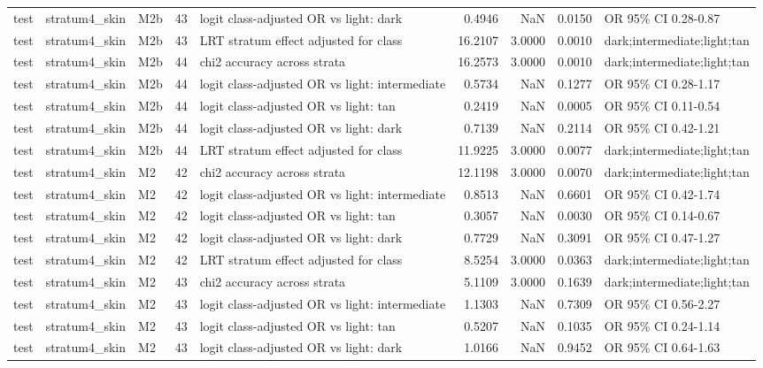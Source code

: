 \begin{tabular}{lllrlrrrl}
test & stratum4\_skin & M2b & 43 & logit class-adjusted OR vs light: dark & 0.4946 & NaN & 0.0150 & OR 95\% CI 0.28-0.87 \\
test & stratum4\_skin & M2b & 43 & LRT stratum effect adjusted for class & 16.2107 & 3.0000 & 0.0010 & dark;intermediate;light;tan \\
test & stratum4\_skin & M2b & 44 & chi2 accuracy across strata & 16.2573 & 3.0000 & 0.0010 & dark;intermediate;light;tan \\
test & stratum4\_skin & M2b & 44 & logit class-adjusted OR vs light: intermediate & 0.5734 & NaN & 0.1277 & OR 95\% CI 0.28-1.17 \\
test & stratum4\_skin & M2b & 44 & logit class-adjusted OR vs light: tan & 0.2419 & NaN & 0.0005 & OR 95\% CI 0.11-0.54 \\
test & stratum4\_skin & M2b & 44 & logit class-adjusted OR vs light: dark & 0.7139 & NaN & 0.2114 & OR 95\% CI 0.42-1.21 \\
test & stratum4\_skin & M2b & 44 & LRT stratum effect adjusted for class & 11.9225 & 3.0000 & 0.0077 & dark;intermediate;light;tan \\
test & stratum4\_skin & M2 & 42 & chi2 accuracy across strata & 12.1198 & 3.0000 & 0.0070 & dark;intermediate;light;tan \\
test & stratum4\_skin & M2 & 42 & logit class-adjusted OR vs light: intermediate & 0.8513 & NaN & 0.6601 & OR 95\% CI 0.42-1.74 \\
test & stratum4\_skin & M2 & 42 & logit class-adjusted OR vs light: tan & 0.3057 & NaN & 0.0030 & OR 95\% CI 0.14-0.67 \\
test & stratum4\_skin & M2 & 42 & logit class-adjusted OR vs light: dark & 0.7729 & NaN & 0.3091 & OR 95\% CI 0.47-1.27 \\
test & stratum4\_skin & M2 & 42 & LRT stratum effect adjusted for class & 8.5254 & 3.0000 & 0.0363 & dark;intermediate;light;tan \\
test & stratum4\_skin & M2 & 43 & chi2 accuracy across strata & 5.1109 & 3.0000 & 0.1639 & dark;intermediate;light;tan \\
test & stratum4\_skin & M2 & 43 & logit class-adjusted OR vs light: intermediate & 1.1303 & NaN & 0.7309 & OR 95\% CI 0.56-2.27 \\
test & stratum4\_skin & M2 & 43 & logit class-adjusted OR vs light: tan & 0.5207 & NaN & 0.1035 & OR 95\% CI 0.24-1.14 \\
test & stratum4\_skin & M2 & 43 & logit class-adjusted OR vs light: dark & 1.0166 & NaN & 0.9452 & OR 95\% CI 0.64-1.63 \\

\end{tabular}
